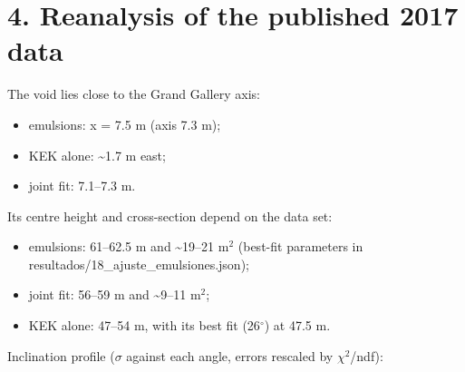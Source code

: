 \documentclass[
  11pt,
]{article}
\providecommand{\tightlist}{%
  \setlength{\itemsep}{0pt}\setlength{\parskip}{0pt}}
\begin{document}
\hypertarget{reanalysis-of-the-published-2017-data}{%
\section{4. Reanalysis of the published 2017
data}\label{reanalysis-of-the-published-2017-data}}

The void lies close to the Grand Gallery axis:

\begin{itemize}
\tightlist
\item
  emulsions: x = 7.5 m (axis 7.3 m);
\item
  KEK alone: \textasciitilde1.7 m east;
\item
  joint fit: 7.1--7.3 m.
\end{itemize}

Its centre height and cross-section depend on the data set:

\begin{itemize}
\tightlist
\item
  emulsions: 61--62.5 m and \textasciitilde19--21 m\(^{2}\) (best-fit
  parameters in resultados/18\_ajuste\_emulsiones.json);
\item
  joint fit: 56--59 m and \textasciitilde9--11 m\(^{2}\);
\item
  KEK alone: 47--54 m, with its best fit (26\(^\circ\)) at 47.5 m.
\end{itemize}

Inclination profile (\(\sigma\) against each angle, errors rescaled by
\(\chi^{2}\)/ndf):
\end{document}

